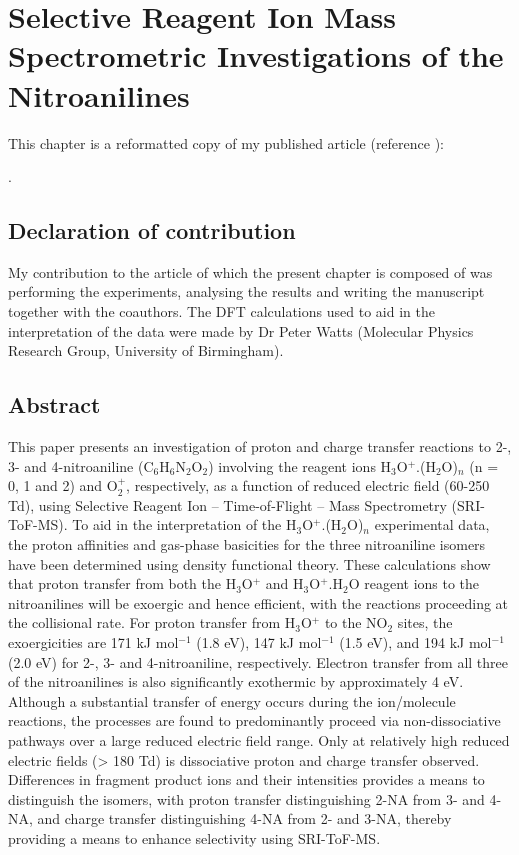 \chapter{Selective Reagent Ion Mass Spectrometric Investigations of the Nitroanilines}\label{chapter:nas}


This chapter is a reformatted copy of my published article (reference \cite{nitroanilinespaperreference}):

.








\section*{Declaration of contribution}
My contribution to the article of which the present chapter is composed of was 
performing the experiments, analysing the results and writing the manuscript together with the coauthors. 
The DFT calculations used to aid in the interpretation of the data were made by Dr Peter Watts (Molecular Physics Research Group, University of Birmingham).








\section{Abstract}
This paper presents an investigation of proton and charge transfer reactions to 2-, 3- and 4-nitroaniline (C$_6$H$_6$N$_2$O$_2$) involving the reagent ions H$_3$O$^+$.(H$_2$O)$_n$ (n = 0, 1 and 2) and O$_2^+$, respectively, as a function of reduced electric field (60-250 Td), using Selective Reagent Ion – Time-of-Flight – Mass Spectrometry (SRI-ToF-MS). To aid in the interpretation of the H$_3$O$^+$.(H$_2$O)$_n$ experimental data, the proton affinities and gas-phase basicities for the three nitroaniline isomers have been determined using density functional theory. These calculations show that proton transfer from both the H$_3$O$^+$ and H$_3$O$^+$.H$_2$O reagent ions to the nitroanilines will be exoergic and hence efficient, with the reactions proceeding at the collisional rate. For proton transfer from H$_3$O$^+$ to the NO$_2$ sites, the exoergicities are 171 kJ mol$^{-1}$ (1.8 eV), 147 kJ mol$^{-1}$ (1.5 eV), and 194 kJ mol$^{-1}$ (2.0 eV) for 2-, 3- and 4-nitroaniline, respectively. Electron transfer from all three of the nitroanilines is also significantly exothermic by approximately 4 eV. Although a substantial transfer of energy occurs during the ion/molecule reactions, the processes are found to predominantly proceed via non-dissociative pathways over a large reduced electric field range. Only at relatively high reduced electric fields (> 180 Td) is dissociative proton and charge transfer observed. Differences in fragment product ions and their intensities provides a means to distinguish the isomers, with proton transfer distinguishing 2-NA from 3- and 4-NA, and charge transfer distinguishing 4-NA from 2- and 3-NA, thereby providing a means to enhance selectivity using SRI-ToF-MS.


